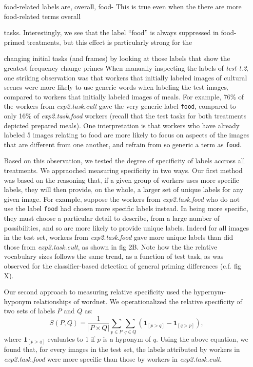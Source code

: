 \documentclass[12pt]{article}
\begin{document}
food-related labels are,
overall, 
food-  This is true even when the there are more food-related
terms overall

tasks.  Interestingly, we see that the label ``food'' is always suppressed
in food-primed treatments, but this effect is particularly strong for the


changing initial tasks (and frames) by looking at those labels that show
the greatest frequency change
primes 
When manually inspecting the labels of \textit{test-t.2}, one striking 
observation was that workers that initially labeled images of cultural scenes 
were more likely to use generic words when labeling the test images, compared 
to workers that initially labeled images of meals.  For example, 76\% of the 
workers from \textit{exp2.task.cult} gave the very generic label 
\texttt{food}, compared to only 16\% of \textit{exp2.task.food} workers 
(recall that the test tasks for both treatments depicted prepared meals).
One interpretation is that workers who have already labeled 5 images relating
to food are more likely to focus on aspects of the images that are different
from one another, and refrain from so generic a term as \texttt{food}.

Based on this observation, we tested the degree of specificity of labels 
accross all treatments.  We appraoched measuring specificity in two ways.
Our first method was based on the reasoning that, if a given group of 
workers uses more specific labels, they will then provide, on the whole,
a larger set of unique labels for any given image.  For example,
suppose the workers from \textit{exp2.task.food} who do not use the label 
\texttt{food} had chosen more specific labels instead.  In being more 
specific, they must choose a particular detail to describe, from a large 
number of possibilities, and so are more likely to provide unique labels.
Indeed
for all images in the test set, workers from \textit{exp2.task.food} gave
more unique labels than did those from \textit{exp2.task.cult}, as shown 
in fig 2B.  Note how the the relative vocabulary sizes follows
the same trend, as a function of test task, as was observed for the 
classifier-based detection of general priming differences (c.f. fig X).

Our second approach to measuring relative specificity used the 
hypernym-hyponym relationships of wordnet.
We operationalized the relative specificity of two sets of labels $P$ 
and $Q$ as:
$$
	S(P,Q) = \frac{1}{|P \times Q|}\sum_{p \in P} \sum_{q \in Q} 
		\left(\mathbf{1}_{[p>q]} - \mathbf{1}_{[q>p]}\right),
$$
where $\mathbf{1}_{[p>q]}$ evaluates to 1 if $p$ is a hyponym of $q$.
Using the above equation, we found that, for every images in the 
test set, the labels attributed by workers in \textit{exp2.task.food} were 
more specific than those by workers in \textit{exp2.task.cult}.
\end{document}
